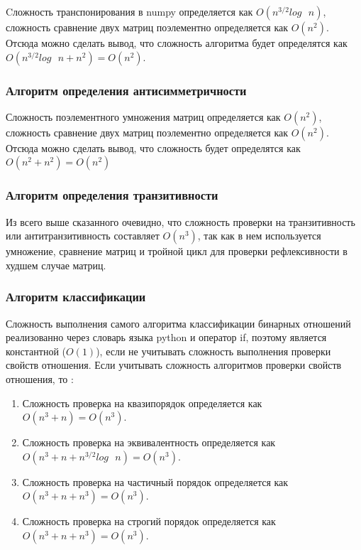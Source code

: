 \documentclass[spec, och, labwork]{shiza}
\begin{document}
            Cложность транспонирования в numpy определяется как $O(n^{3/2}log \text{ } n)$, сложность сравнение двух матриц поэлементно определяется как $O(n^2)$. 
            Отсюда можно сделать вывод, что сложность алгоритма будет определятся как 
            $O(n^{3/2}log \text{ } n + n^2) = O(n^2)$.

        \subsubsection{Алгоритм определения антисимметричности}

            Сложность поэлементного умножения матриц определяется как $O(n^2)$, сложность сравнение двух матриц поэлементно определяется как $O(n^2)$.
            Отсюда можно сделать вывод, что сложность будет определятся как $O(n^2 + n^2) = O(n^2)$

        \subsubsection{Алгоритм определения транзитивности}

            Из всего выше сказанного очевидно, что сложность проверки на транзитивность или антитранзитивность составляет $O(n^3)$,
            так как в нем используется умножение, сравнение матриц и тройной цикл для проверки рефлексивности в худшем случае матриц.

        \subsubsection{Алгоритм классификации}
            Сложность выполнения самого алгоритма классификации бинарных отношений реализованно через словарь языка python
            и оператор if, поэтому является константной ($O(1)$), если не учитывать сложность выполнения проверки свойств отношения.
            Если учитывать сложность алгоритмов проверки свойств отношения, то :

            \begin{enumerate}
                \item Сложность проверка на квазипорядок определяется как $O(n^3 + n) = O(n^3)$.
                \item Сложность проверка на эквивалентность определяется как $O(n^3 + n + n^{3/2}log \text{ } n) = O(n^3)$.
                \item Сложность проверка на частичный порядок определяется как $O(n^3 + n + n^3) = O(n^3)$.
                \item Сложность проверка на строгий порядок определяется как $O(n^3 + n + n^3) = O(n^3)$.
            \end{enumerate}
\end{document}

